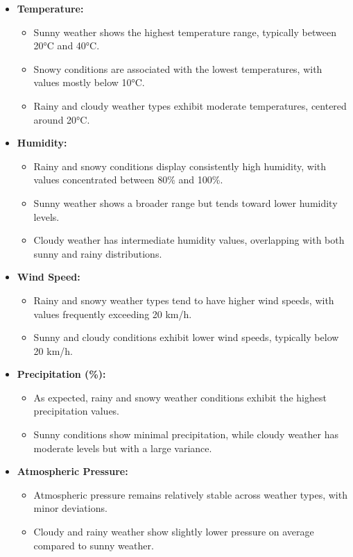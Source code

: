 \documentclass{article}
\begin{document}
\begin{itemize}
    \item \textbf{Temperature:} 
    \begin{itemize}
        \item Sunny weather shows the highest temperature range, typically between 20°C and 40°C.
        \item Snowy conditions are associated with the lowest temperatures, with values mostly below 10°C.
        \item Rainy and cloudy weather types exhibit moderate temperatures, centered around 20°C.
    \end{itemize}
    
    \item \textbf{Humidity:}
    \begin{itemize}
        \item Rainy and snowy conditions display consistently high humidity, with values concentrated between 80\% and 100\%.
        \item Sunny weather shows a broader range but tends toward lower humidity levels.
        \item Cloudy weather has intermediate humidity values, overlapping with both sunny and rainy distributions.
    \end{itemize}

    \item \textbf{Wind Speed:}
    \begin{itemize}
        \item Rainy and snowy weather types tend to have higher wind speeds, with values frequently exceeding 20 km/h.
        \item Sunny and cloudy conditions exhibit lower wind speeds, typically below 20 km/h.
    \end{itemize}

    \item \textbf{Precipitation (\%):}
    \begin{itemize}
        \item As expected, rainy and snowy weather conditions exhibit the highest precipitation values.
        \item Sunny conditions show minimal precipitation, while cloudy weather has moderate levels but with a large variance.
    \end{itemize}

    \item \textbf{Atmospheric Pressure:}
    \begin{itemize}
        \item Atmospheric pressure remains relatively stable across weather types, with minor deviations.
        \item Cloudy and rainy weather show slightly lower pressure on average compared to sunny weather.
    \end{itemize}


\end{itemize}
\end{document}
